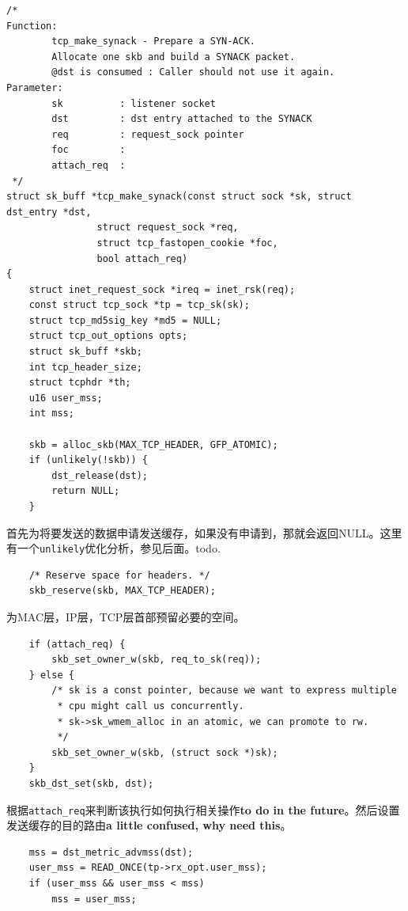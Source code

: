 \begin{verbatim}
/*
Function:
        tcp_make_synack - Prepare a SYN-ACK.
        Allocate one skb and build a SYNACK packet.
        @dst is consumed : Caller should not use it again.
Parameter:
        sk          : listener socket
        dst         : dst entry attached to the SYNACK
        req         : request_sock pointer
        foc         :
        attach_req  :
 */
struct sk_buff *tcp_make_synack(const struct sock *sk, struct dst_entry *dst,
                struct request_sock *req,
                struct tcp_fastopen_cookie *foc,
                bool attach_req)
{
    struct inet_request_sock *ireq = inet_rsk(req);
    const struct tcp_sock *tp = tcp_sk(sk);
    struct tcp_md5sig_key *md5 = NULL;
    struct tcp_out_options opts;
    struct sk_buff *skb;
    int tcp_header_size;
    struct tcphdr *th;
    u16 user_mss;
    int mss;

    skb = alloc_skb(MAX_TCP_HEADER, GFP_ATOMIC);
    if (unlikely(!skb)) {
        dst_release(dst);
        return NULL;
    }
\end{verbatim}

                首先为将要发送的数据申请发送缓存，如果没有申请到，那就会返回NULL。这里有一个\texttt{unlikely}优化分析，参见后面。todo.

\begin{verbatim}
    /* Reserve space for headers. */
    skb_reserve(skb, MAX_TCP_HEADER);
\end{verbatim}

                为MAC层，IP层，TCP层首部预留必要的空间。

\begin{verbatim}
    if (attach_req) {
        skb_set_owner_w(skb, req_to_sk(req));
    } else {
        /* sk is a const pointer, because we want to express multiple
         * cpu might call us concurrently.
         * sk->sk_wmem_alloc in an atomic, we can promote to rw.
         */
        skb_set_owner_w(skb, (struct sock *)sk);
    }
    skb_dst_set(skb, dst);
\end{verbatim}

                根据\texttt{attach_req}来判断该执行如何执行相关操作\textbf{to do in the future}。然后设置发送缓存的目的路由\textbf{a little confused, why need this}。

\begin{verbatim}
    mss = dst_metric_advmss(dst);
    user_mss = READ_ONCE(tp->rx_opt.user_mss);
    if (user_mss && user_mss < mss)
        mss = user_mss;
\end{verbatim}

